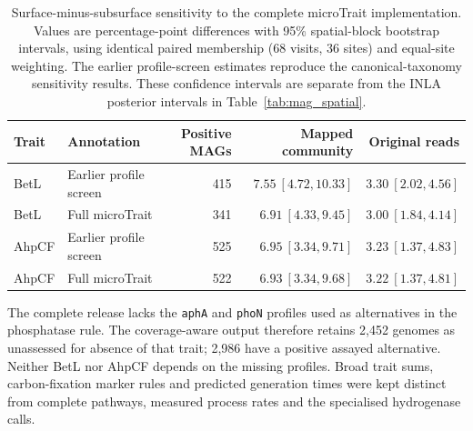 \begin{table}[htbp]\centering\small
\caption{Surface-minus-subsurface sensitivity to the complete microTrait implementation. Values are percentage-point differences with 95\% spatial-block bootstrap intervals, using identical paired membership (68 visits, 36 sites) and equal-site weighting. The earlier profile-screen estimates reproduce the canonical-taxonomy sensitivity results. These confidence intervals are separate from the INLA posterior intervals in Table~\ref{tab:mag_spatial}.}
\label{tab:microtrait_sensitivity}
\begin{tabular}{llrrr}\toprule
Trait & Annotation & Positive MAGs & Mapped community & Original reads\\\midrule
BetL & Earlier profile screen & 415 & $7.55\ [4.72,10.33]$ & $3.30\ [2.02,4.56]$\\
BetL & Full microTrait & 341 & $6.91\ [4.33,9.45]$ & $3.00\ [1.84,4.14]$\\
AhpCF & Earlier profile screen & 525 & $6.95\ [3.34,9.71]$ & $3.23\ [1.37,4.83]$\\
AhpCF & Full microTrait & 522 & $6.93\ [3.34,9.68]$ & $3.22\ [1.37,4.81]$\\\bottomrule
\end{tabular}
\end{table}

The complete release lacks the \texttt{aphA} and \texttt{phoN} profiles used as alternatives in the phosphatase rule. The coverage-aware output therefore retains 2,452 genomes as unassessed for absence of that trait; 2,986 have a positive assayed alternative. Neither BetL nor AhpCF depends on the missing profiles. Broad trait sums, carbon-fixation marker rules and predicted generation times were kept distinct from complete pathways, measured process rates and the specialised hydrogenase calls.
